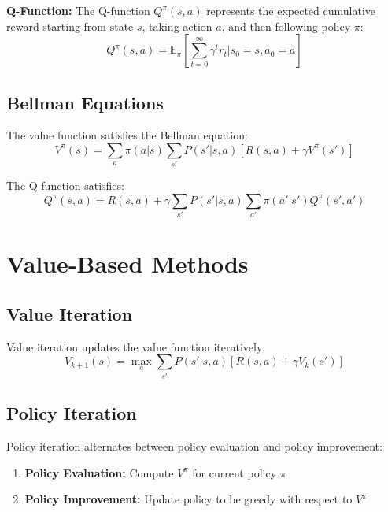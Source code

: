 \textbf{Q-Function:} The Q-function $Q^\pi(s,a)$ represents the expected cumulative reward starting from state $s$, taking action $a$, and then following policy $\pi$:
\begin{equation}
    Q^\pi(s,a) = \mathbb{E}_\pi\left[\sum_{t=0}^\infty \gamma^t r_t | s_0 = s, a_0 = a\right]
\end{equation}

\subsection{Bellman Equations}

The value function satisfies the Bellman equation:
\begin{equation}
    V^\pi(s) = \sum_a \pi(a|s) \sum_{s'} P(s'|s,a)[R(s,a) + \gamma V^\pi(s')]
\end{equation}

The Q-function satisfies:
\begin{equation}
    Q^\pi(s,a) = R(s,a) + \gamma \sum_{s'} P(s'|s,a) \sum_{a'} \pi(a'|s') Q^\pi(s',a')
\end{equation}

\section{Value-Based Methods}

\subsection{Value Iteration}

Value iteration updates the value function iteratively:
\begin{equation}
    V_{k+1}(s) = \max_a \sum_{s'} P(s'|s,a)[R(s,a) + \gamma V_k(s')]
\end{equation}

\subsection{Policy Iteration}

Policy iteration alternates between policy evaluation and policy improvement:
\begin{enumerate}
    \item \textbf{Policy Evaluation:} Compute $V^\pi$ for current policy $\pi$
    \item \textbf{Policy Improvement:} Update policy to be greedy with respect to $V^\pi$
\end{enumerate}

